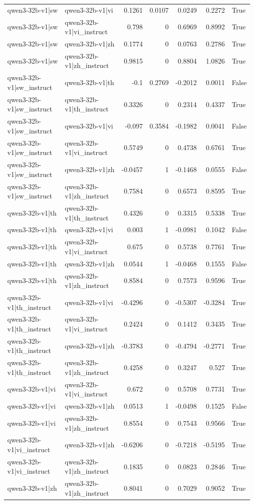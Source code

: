 \begin{table}
\begin{tabular}{l l r r r r l}
qwen3-32b-v1|sw & qwen3-32b-v1|vi & 0.1261 & 0.0107 & 0.0249 & 0.2272 & True \\
qwen3-32b-v1|sw & qwen3-32b-v1|vi_instruct & 0.798 & 0 & 0.6969 & 0.8992 & True \\
qwen3-32b-v1|sw & qwen3-32b-v1|zh & 0.1774 & 0 & 0.0763 & 0.2786 & True \\
qwen3-32b-v1|sw & qwen3-32b-v1|zh_instruct & 0.9815 & 0 & 0.8804 & 1.0826 & True \\
qwen3-32b-v1|sw_instruct & qwen3-32b-v1|th & -0.1 & 0.2769 & -0.2012 & 0.0011 & False \\
qwen3-32b-v1|sw_instruct & qwen3-32b-v1|th_instruct & 0.3326 & 0 & 0.2314 & 0.4337 & True \\
qwen3-32b-v1|sw_instruct & qwen3-32b-v1|vi & -0.097 & 0.3584 & -0.1982 & 0.0041 & False \\
qwen3-32b-v1|sw_instruct & qwen3-32b-v1|vi_instruct & 0.5749 & 0 & 0.4738 & 0.6761 & True \\
qwen3-32b-v1|sw_instruct & qwen3-32b-v1|zh & -0.0457 & 1 & -0.1468 & 0.0555 & False \\
qwen3-32b-v1|sw_instruct & qwen3-32b-v1|zh_instruct & 0.7584 & 0 & 0.6573 & 0.8595 & True \\
qwen3-32b-v1|th & qwen3-32b-v1|th_instruct & 0.4326 & 0 & 0.3315 & 0.5338 & True \\
qwen3-32b-v1|th & qwen3-32b-v1|vi & 0.003 & 1 & -0.0981 & 0.1042 & False \\
qwen3-32b-v1|th & qwen3-32b-v1|vi_instruct & 0.675 & 0 & 0.5738 & 0.7761 & True \\
qwen3-32b-v1|th & qwen3-32b-v1|zh & 0.0544 & 1 & -0.0468 & 0.1555 & False \\
qwen3-32b-v1|th & qwen3-32b-v1|zh_instruct & 0.8584 & 0 & 0.7573 & 0.9596 & True \\
qwen3-32b-v1|th_instruct & qwen3-32b-v1|vi & -0.4296 & 0 & -0.5307 & -0.3284 & True \\
qwen3-32b-v1|th_instruct & qwen3-32b-v1|vi_instruct & 0.2424 & 0 & 0.1412 & 0.3435 & True \\
qwen3-32b-v1|th_instruct & qwen3-32b-v1|zh & -0.3783 & 0 & -0.4794 & -0.2771 & True \\
qwen3-32b-v1|th_instruct & qwen3-32b-v1|zh_instruct & 0.4258 & 0 & 0.3247 & 0.527 & True \\
qwen3-32b-v1|vi & qwen3-32b-v1|vi_instruct & 0.672 & 0 & 0.5708 & 0.7731 & True \\
qwen3-32b-v1|vi & qwen3-32b-v1|zh & 0.0513 & 1 & -0.0498 & 0.1525 & False \\
qwen3-32b-v1|vi & qwen3-32b-v1|zh_instruct & 0.8554 & 0 & 0.7543 & 0.9566 & True \\
qwen3-32b-v1|vi_instruct & qwen3-32b-v1|zh & -0.6206 & 0 & -0.7218 & -0.5195 & True \\
qwen3-32b-v1|vi_instruct & qwen3-32b-v1|zh_instruct & 0.1835 & 0 & 0.0823 & 0.2846 & True \\
qwen3-32b-v1|zh & qwen3-32b-v1|zh_instruct & 0.8041 & 0 & 0.7029 & 0.9052 & True \\
\bottomrule
\end{tabular}
\end{table}
